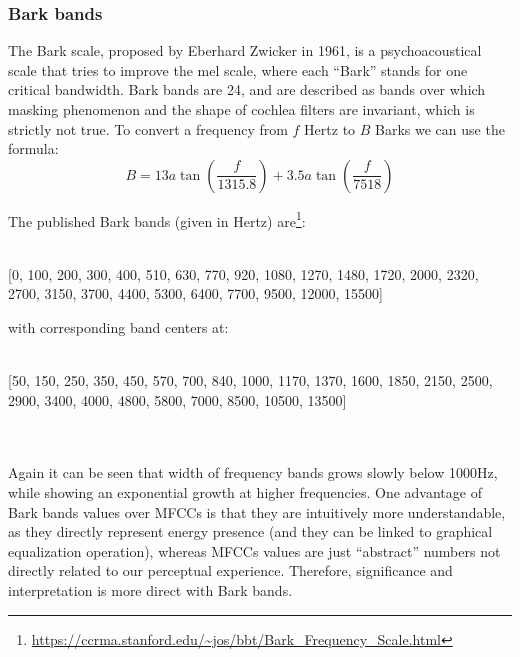 \subsubsection{Bark bands}
The Bark scale, proposed by Eberhard Zwicker in 1961, is a psychoacoustical scale that tries to improve the mel scale, where each ``Bark'' stands for one critical bandwidth. Bark bands are 24, and are described as bands over which masking phenomenon and the shape of cochlea filters are invariant, which is strictly not true. To convert a frequency from $f$ Hertz to $B$ Barks we can use the formula:
\begin{equation}
B = 13a\tan \left(\frac{f}{1315.8} \right) + 3.5a\tan \left( \frac{f}{7518} \right)
\end{equation}

The published Bark bands (given in Hertz) are\footnote{\url{https://ccrma.stanford.edu/~jos/bbt/Bark_Frequency_Scale.html}}:\\ \\
\hfill\begin{minipage}{\dimexpr\textwidth-1.5cm}
[0, 100, 200, 300, 400, 510, 630, 770, 920, 1080, 1270, 1480, 1720, 2000, 2320, 2700, 3150, 3700, 4400, 5300, 6400, 7700, 9500, 12000, 15500]
\xdef\tpd{\the\prevdepth}
\end{minipage}

with corresponding band centers at:\\ \\
\hfill\begin{minipage}{\dimexpr\textwidth-1.5cm}
[50, 150, 250, 350, 450, 570, 700, 840, 1000, 1170, 1370, 1600, 1850, 2150, 2500, 2900, 3400, 4000, 4800, 5800, 7000, 8500, 10500, 13500]
\xdef\tpd{\the\prevdepth}
\end{minipage}
\\ \\
Again it can be seen that width of frequency bands grows slowly below 1000Hz, while showing an exponential growth at higher frequencies. One advantage of Bark bands values over MFCCs is that they are intuitively more understandable, as they directly represent energy presence (and they can be linked to graphical equalization operation), whereas MFCCs values are just ``abstract'' numbers not directly related to our perceptual experience.
Therefore, significance and interpretation is more direct with Bark bands.

